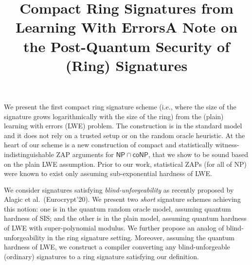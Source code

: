 \documentclass[margin]{res}
\begin{document}
\begin{resume}
\location{}
\vspace{1mm}
\title{\textbf{Compact Ring Signatures from Learning With Errors}}
\begin{position}
We present the first compact ring signature scheme (i.e., where the size of the signature grows logarithmically with the size of the ring) from the (plain) learning with errors (LWE) problem. The construction is in the standard model and it does not rely on a trusted setup or on the random oracle heuristic. At the heart of our scheme is a new construction of compact and statistically witness-indistinguishable ZAP arguments for $\mathsf{NP \cap coNP}$, that we show to be sound based on the plain LWE assumption. Prior to our work, statistical ZAPs (for all of NP) were known to exist only assuming sub-exponential hardness of LWE. 
\end{position}

\location{}
\title{\textbf{A Note on the Post-Quantum Security of (Ring) Signatures}}
\begin{position}
We consider signatures satisfying {\em blind-unforgeability} as recently proposed by Alagic et al.\ (Eurocrypt'20). We present two {\em short} signature schemes achieving this notion: one is in the quantum random oracle model, assuming quantum hardness of SIS; and the other is in the plain model, assuming quantum hardness of LWE with super-polynomial modulus. We further propose an analog of blind-unforgeability in the ring signature setting. Moreover, assuming the quantum hardness of LWE, we construct a compiler converting any blind-unforgeable (ordinary) signatures to a ring signature satisfying our definition. 
\end{position}



\end{resume}
\end{document}
